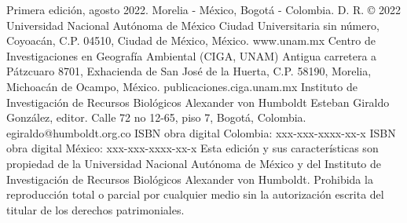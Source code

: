 \begin{multicols*}{2}
{    \linebreak
    \newline Primera edición, agosto 2022. Morelia - México, Bogotá - Colombia.  
    D. R. © 2022 Universidad Nacional Autónoma de México 
    Ciudad Universitaria sin número, Coyoacán, C.P. 04510, Ciudad de México, México.
    www.unam.mx
    \newline Centro de Investigaciones en Geografía Ambiental (CIGA, UNAM) 
    Antigua carretera a Pátzcuaro 8701, Exhacienda de San José de la Huerta, C.P. 58190, Morelia, Michoacán de Ocampo, México.
    publicaciones.ciga.unam.mx
    \newline Instituto de Investigación de Recursos Biológicos Alexander von Humboldt
    Esteban Giraldo González, editor.
    Calle 72 no 12-65, piso 7, Bogotá, Colombia.
    egiraldo@humboldt.org.co 
    \newline ISBN obra digital Colombia: xxx-xxx-xxxx-xx-x \hspace*{\fill}
    \newline ISBN obra digital México: xxx-xxx-xxxx-xx-x \hspace*{\fill}
    \linebreak
    \newline Esta edición y sus características son propiedad de la Universidad Nacional Autónoma de México y del Instituto de Investigación de Recursos Biológicos Alexander von Humboldt. Prohibida la reproducción total o parcial por cualquier medio sin la autorización escrita del titular de los derechos patrimoniales.}
\end{multicols*}
\vspace*{\fill}

\let\maketitle\oldmaketitle
\maketitle